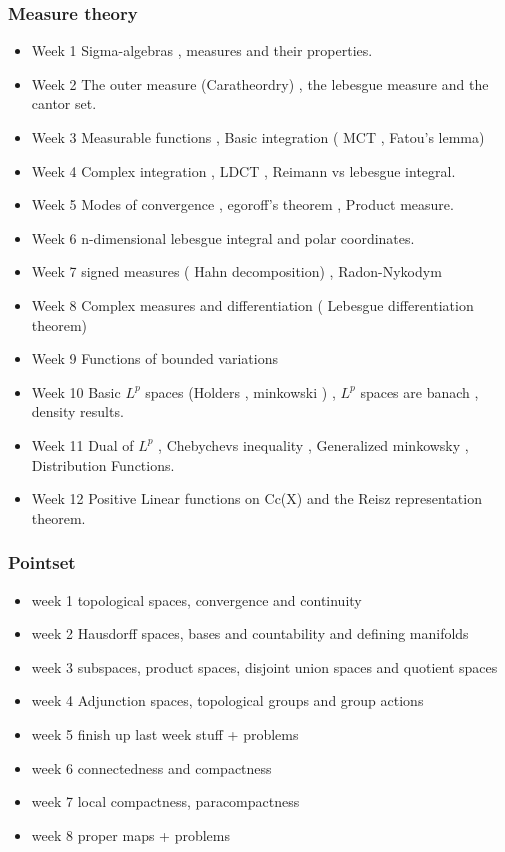 \documentclass{article}
\begin{document}
\subsubsection{Measure theory}
\begin{itemize}
    \item Week 1 Sigma-algebras , measures and their properties. 
    \item Week 2  The outer measure (Caratheordry) , the lebesgue measure and the cantor set.
    \item Week 3  Measurable functions , Basic integration  ( MCT , Fatou's lemma) 
    \item Week 4  Complex integration , LDCT , Reimann vs lebesgue integral. 
    \item Week 5 Modes of convergence , egoroff's theorem , Product measure.
    \item Week 6 n-dimensional lebesgue integral and polar coordinates. 
    \item Week 7 signed measures ( Hahn decomposition) , Radon-Nykodym 
    \item Week 8 Complex measures and differentiation ( Lebesgue differentiation theorem) 
    \item Week 9 Functions of bounded variations 
    \item Week 10 Basic $L^p$ spaces (Holders , minkowski ) , $L^p$ spaces are banach , density results. 
    \item Week 11  Dual of $L^p$ , Chebychevs inequality , Generalized minkowsky , Distribution Functions. 
    \item Week 12 Positive Linear functions on Cc(X) and the Reisz representation theorem.

\end{itemize}
\subsubsection{Pointset}
\begin{itemize}
    \item week 1 topological spaces, convergence and continuity
    \item week 2 Hausdorff spaces, bases and countability and defining manifolds
    \item week 3 subspaces, product spaces, disjoint union spaces and quotient spaces
    \item week 4 Adjunction spaces, topological groups and group actions
    \item week 5 finish up last week stuff + problems
    \item week 6 connectedness and compactness
    \item week 7 local compactness, paracompactness
    \item week 8 proper maps + problems
\end{itemize}
\fi
\end{document}
